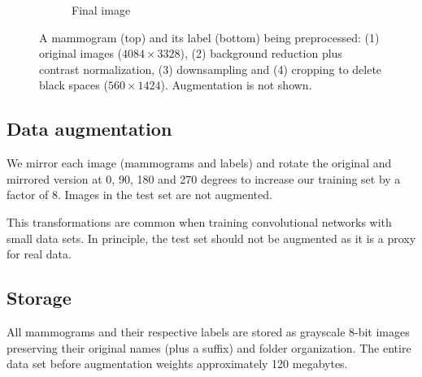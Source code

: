 \begin{figure}[h]
\begin{subfigure}{2.4 cm}
		\caption{Final image}
		\label{subfig:Preprocessingd}
    \end{subfigure}
	\caption[Preprocessing pipeline]{A mammogram (top) and its label (bottom) being preprocessed: (1) original images ($4084 \times 3328$), (2) background reduction plus contrast normalization, (3) downsampling and  (4) cropping to delete black spaces ($560 \times 1424$). Augmentation is not shown.}
	 \label{fig:Preprocessing}
\end{figure}
	
\subsection{Data augmentation}
We mirror each image (mammograms and labels) and rotate the original and mirrored version at 0, 90, 180 and 270 degrees to increase our training set by a factor of 8. 
Images in the test set are not augmented. 

This transformations are common when training convolutional networks with small data sets. In principle, the test set should not be augmented as it is a proxy for real data. %


\subsection{Storage}
All mammograms and their respective labels are stored as grayscale 8-bit images preserving their original names (plus a suffix) and folder organization.
The entire data set before augmentation weights approximately 120 megabytes.
